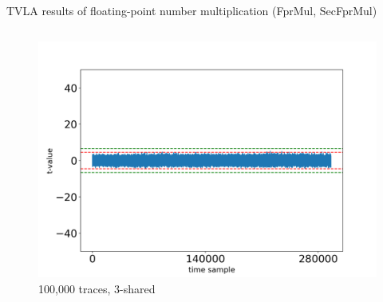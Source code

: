 \begin{frame}{TVLA results of floating-point number multiplication (FprMul, SecFprMul)}
\begin{columns}[T]
\begin{figure}
\includegraphics[width=\textwidth]{figure/tvla-F4-CHES/SecFprMul_3shares_100k.png}
\vspace{-20pt}
\caption{100,000 traces, 3-shared}
\end{figure}

\end{columns}


\end{frame}



